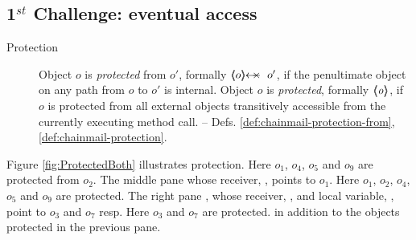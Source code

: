  
 
\subsection{1$^{st}$ Challenge: eventual access} 


 \begin{description}
\item[Protection] Object $o$ is \emph{protected} from $o'$, formally $\protectedFrom {o} {o'}$,  
 if the penultimate object on any path from $o$ to $o'$  is internal.
Object $o$ is \emph{protected}, formally ${\langle\!\!\langle \mbox{\normalfont{\texttt{\it{o}}}} \rangle\!\!\rangle}$, if $o$ is protected from all external objects transitively accessible from the currently executing method call. %
-- \cf Defs. \ref{def:chainmail-protection-from}, \ %
\ref{def:chainmail-protection}.
 \end{description}
 

Figure \ref{fig:ProtectedBoth} illustrates  protection.  
Here  $o_1$, $o_4$, $o_5$ and $o_9$ 
are protected from $o_2$. 
 The middle pane  whose receiver,   ,  points to $o_1$. Here 
 $o_1$, $o_2$, $o_4$, $o_5$ and $o_9$  are protected. 
 The right pane , whose receiver,  ,  and local variable, , point to $o_3$ and  $o_7$ resp.
 Here $o_3$ and $o_7$ are protected.  in addition  to  the objects protected in the previous pane. 



